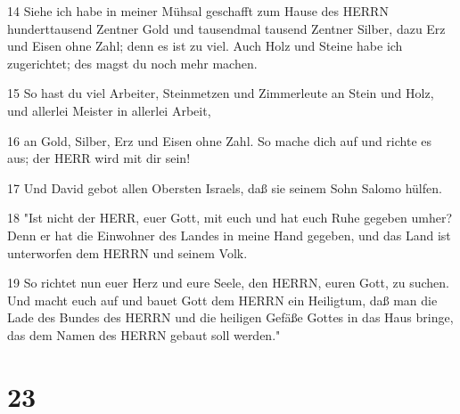\par 14 Siehe ich habe in meiner Mühsal geschafft zum Hause des HERRN hunderttausend Zentner Gold und tausendmal tausend Zentner Silber, dazu Erz und Eisen ohne Zahl; denn es ist zu viel. Auch Holz und Steine habe ich zugerichtet; des magst du noch mehr machen.
\par 15 So hast du viel Arbeiter, Steinmetzen und Zimmerleute an Stein und Holz, und allerlei Meister in allerlei Arbeit,
\par 16 an Gold, Silber, Erz und Eisen ohne Zahl. So mache dich auf und richte es aus; der HERR wird mit dir sein!
\par 17 Und David gebot allen Obersten Israels, daß sie seinem Sohn Salomo hülfen.
\par 18 "Ist nicht der HERR, euer Gott, mit euch und hat euch Ruhe gegeben umher? Denn er hat die Einwohner des Landes in meine Hand gegeben, und das Land ist unterworfen dem HERRN und seinem Volk.
\par 19 So richtet nun euer Herz und eure Seele, den HERRN, euren Gott, zu suchen. Und macht euch auf und bauet Gott dem HERRN ein Heiligtum, daß man die Lade des Bundes des HERRN und die heiligen Gefäße Gottes in das Haus bringe, das dem Namen des HERRN gebaut soll werden."

\chapter{23}

